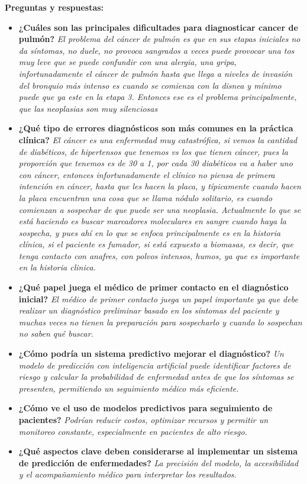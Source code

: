 \textbf{Preguntas y respuestas:}
\begin{itemize}
\item \textbf{¿Cuáles son las principales dificultades para diagnosticar cancer de pulmón?}
\textit{El problema del cáncer de pulmón es que en sus etapas iniciales no da síntomas, no duele, no provoca sangrados a veces puede provocar una tos muy leve que se puede confundir con una alergia, una gripa, infortunadamente el cáncer de pulmón hasta que llega a niveles de invasión del bronquio más intenso es cuando se comienza con la disnea y mínimo puede que ya este en la etapa 3. Entonces ese es el problema principalmente, que las neoplasias son muy silenciosas}
\item\textbf{¿Qué tipo de errores diagnósticos son más comunes en la práctica clínica? }
\textit{El cáncer es una enfermedad muy catastrófica, si vemos la cantidad de diabéticos, de hipertensos que tenemos vs los que tienen cáncer, pues la proporción que tenemos es de 30 a 1, por cada 30 diabéticos va a haber uno con cáncer, entonces infortunadamente el clínico no piensa de primera intención en cáncer, hasta que les hacen la placa, y típicamente cuando hacen la placa encuentran una cosa que se llama nódulo solitario, es cuando comienzan a sospechar de que puede ser una neoplasia. Actualmente lo que se está haciendo es buscar marcadores moleculares en sangre cuando haya la sospecha, y pues ahí en lo que se enfoca principalmente es en la historia clínica, si el paciente es fumador, si está expuesto a biomasas, es decir, que tenga contacto con anafres, con polvos intensos, humos, ya que es importante en la historia clinica.}
\item\textbf{¿Qué papel juega el médico de primer contacto en el diagnóstico inicial?}
\textit{El médico de primer contacto juega un papel importante ya que debe realizar un diagnóstico preliminar basado en los síntomas del paciente y muchas veces no tienen la preparación para sospecharlo y cuando lo sospechan no saben qué buscar.}
\item \textbf{¿Cómo podría un sistema predictivo mejorar el diagnóstico?}
\textit{Un modelo de predicción con inteligencia artificial puede identificar factores de riesgo y calcular la probabilidad de enfermedad antes de que los síntomas se presenten, permitiendo un seguimiento médico más eficiente.}
\item \textbf{¿Cómo ve el uso de modelos predictivos para seguimiento de pacientes?}
\textit{Podrían reducir costos, optimizar recursos y permitir un monitoreo constante, especialmente en pacientes de alto riesgo.}
\item \textbf{¿Qué aspectos clave deben considerarse al implementar un sistema de predicción de enfermedades?}
\textit{La precisión del modelo, la accesibilidad y el acompañamiento médico para interpretar los resultados.}
\end{itemize}


